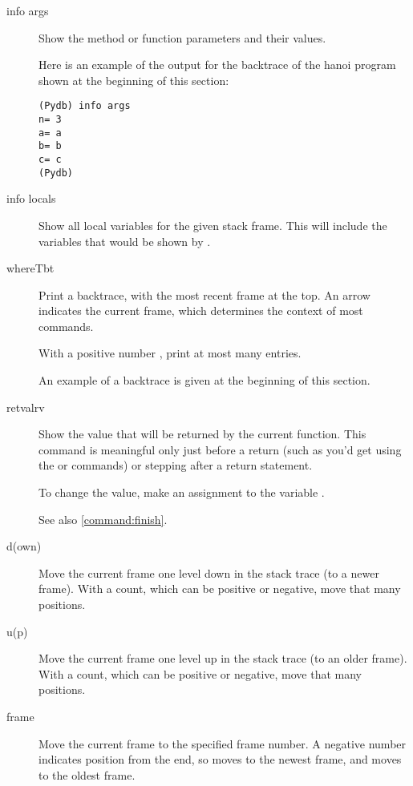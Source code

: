\begin{description}

\item[info args]\label{command:info-args}

Show the method or function parameters and their values. 

Here is an example of the output for the backtrace of the hanoi
program shown at the beginning of this section:

\begin{verbatim}
(Pydb) info args
n= 3
a= a
b= b
c= c
(Pydb) 
\end{verbatim}

\item[info locals]\label{command:info-locals}

Show all local variables for the given stack frame. This will include
the variables that would be shown by .

\item[where\code{\Large{|}}T\code{\Large{|}}bt ]

Print a backtrace, with the most recent frame at the top.  An
arrow indicates the current frame, which determines the context of
most commands.

With a positive number , print at most many entries.

An example of a backtrace is given at the beginning of this section.

\item[retval\code{\Large{|}}rv]\label{command:retval}

Show the value that will be returned by the current function. This
command is meaningful only just before a return (such as you'd get
using the  or  commands) or stepping after a
return statement.

To change the value, make an assignment to the variable
.

See also \ref{command:finish}.

\item[d(own) ]

Move the current frame one level down in the stack trace
(to a newer frame). With a count, which can be  positive
or  negative, move that many positions.

\item[u(p) ]

Move the current frame one level up in the stack trace (to an older
frame). With a count, which can be positive or negative,
move that many positions.

\item[frame ]
Move the current frame to the specified frame number. A negative
number indicates position from the end, so  moves to 
the newest frame, and  moves to the oldest frame.

\end{description}

